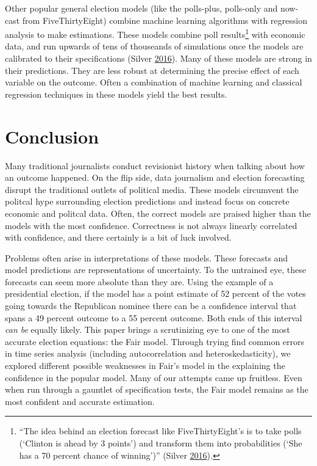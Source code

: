 \documentclass[11,]{article}
\let\rmarkdownfootnote\footnote%
\def\footnote{\protect\rmarkdownfootnote}
\begin{document}
Other popular general election models (like the polls-plus, polls-only
and now-cast from FiveThirtyEight) combine machine learning algorithms
with regression analysis to make estimations. These models combine poll
results\footnote{``The idea behind an election forecast like
  FiveThirtyEight's is to take polls (`Clinton is ahead by 3 points')
  and transform them into probabilities (`She has a 70 percent chance of
  winning')'' (Silver \protect\hyperlink{ref-silver_users_2016}{2016}).}
with economic data, and run upwards of tens of thouseands of simulations
once the models are calibrated to their specifications (Silver
\protect\hyperlink{ref-silver_users_2016}{2016}). Many of these models
are strong in their predictions. They are less robust at determining the
precise effect of each variable on the outcome. Often a combination of
machine learning and classical regression techniques in these models
yield the best results.

\hypertarget{conclusion}{%
\section{Conclusion}\label{conclusion}}

Many traditional journalists conduct revisionist history when talking
about how an outcome happened. On the flip side, data journalism and
election forecasting disrupt the traditional outlets of political media.
These models circumvent the politcal hype surrounding election
predictions and instead focus on concrete economic and politcal data.
Often, the correct models are praised higher than the models with the
most confidence. Correctness is not always linearly correlated with
confidence, and there certainly is a bit of luck involved.

Problems often arise in interpretations of these models. These forecasts
and model predictions are representations of uncertainty. To the
untrained eye, these forecasts can seem more absolute than they are.
Using the example of a presidential election, if the model has a point
estimate of 52 percent of the votes going towards the Republican nominee
there can be a confidence interval that spans a 49 percent outcome to a
55 percent outcome. Both ends of this interval \emph{can be} equally
likely. This paper brings a scrutinizing eye to one of the most accurate
election equations: the Fair model. Through trying find common errors in
time series analysis (including autocorrelation and heteroskedasticity),
we explored different possible weaknesses in Fair's model in the
explaining the confidence in the popular model. Many of our attempts
came up fruitless. Even when run through a gauntlet of specification
tests, the Fair model remains as the most confident and accurate
estimation.
\end{document}
